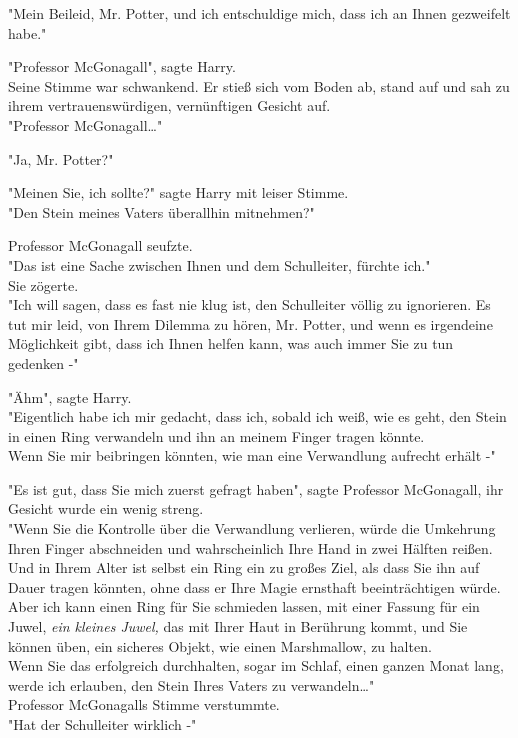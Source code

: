 {"Mein Beileid, Mr. Potter, und ich entschuldige mich, dass ich an Ihnen gezweifelt habe."

"Professor McGonagall", sagte Harry.\\ Seine Stimme war schwankend. Er stieß sich vom Boden ab, stand auf und sah zu ihrem vertrauenswürdigen, vernünftigen Gesicht auf.\\ "Professor McGonagall…"

"Ja, Mr. Potter?"

"Meinen Sie, ich sollte?" sagte Harry mit leiser Stimme.\\ "Den Stein meines Vaters überallhin mitnehmen?"

Professor McGonagall seufzte.\\ "Das ist eine Sache zwischen Ihnen und dem Schulleiter, fürchte ich."\\ Sie zögerte.\\ "Ich will sagen, dass es fast nie klug ist, den Schulleiter völlig zu ignorieren. Es tut mir leid, von Ihrem Dilemma zu hören, Mr. Potter, und wenn es irgendeine Möglichkeit gibt, dass ich Ihnen helfen kann, was auch immer Sie zu tun gedenken -"

"Ähm", sagte Harry.\\ "Eigentlich habe ich mir gedacht, dass ich, sobald ich weiß, wie es geht, den Stein in einen Ring verwandeln und ihn an meinem Finger tragen könnte.\\ Wenn Sie mir beibringen könnten, wie man eine Verwandlung aufrecht erhält -"

"Es ist gut, dass Sie mich zuerst gefragt haben", sagte Professor McGonagall, ihr Gesicht wurde ein wenig streng.\\ "Wenn Sie die Kontrolle über die Verwandlung verlieren, würde die Umkehrung Ihren Finger abschneiden und wahrscheinlich Ihre Hand in zwei Hälften reißen.\\ Und in Ihrem Alter ist selbst ein Ring ein zu großes Ziel, als dass Sie ihn auf Dauer tragen könnten, ohne dass er Ihre Magie ernsthaft beeinträchtigen würde.\\ Aber ich kann einen Ring für Sie schmieden lassen, mit einer Fassung für ein Juwel, \emph{ein kleines Juwel,} das mit Ihrer Haut in Berührung kommt, und Sie können üben, ein sicheres Objekt, wie einen Marshmallow, zu halten.\\ Wenn Sie das erfolgreich durchhalten, sogar im Schlaf, einen ganzen Monat lang, werde ich erlauben, den Stein Ihres Vaters zu verwandeln…"\\ Professor McGonagalls Stimme verstummte.\\ "Hat der Schulleiter wirklich -"

}
